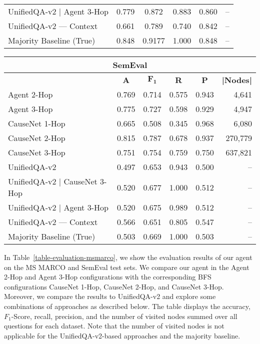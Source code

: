 \begin{table}
\begin{tabular}{lccccr}
			UnifiedQA-v2 | Agent 3-Hop & 0.779 & 0.872 & 0.883 & 0.860 & -- \\
			UnifiedQA-v2 --- Context & 0.661 & 0.789 & 0.740 & 0.842 & --\\
			\midrule
			Majority Baseline (True) & 0.848  & 0.9177 & 1.000 & 0.848 & --\\
			\bottomrule
\end{tabular}
\label{table-evaluation-semeval}
\centering
\renewcommand{\tabcolsep}{6.47pt}
\hspace{-0.20cm}
\begin{tabular}{lccccr} 
			\toprule
			\multicolumn{6}{c}{\textbf{SemEval}}\\
			\midrule
			& \textbf{A} & \textbf{$\mathbf{F_1}$} & \textbf{R} & \textbf{P} & \textbf{|Nodes|}\\
			\midrule
			Agent 2-Hop &  0.769 & 0.714 & 0.575 & 0.943 & 4,641\\
			Agent 3-Hop & 0.775 & 0.727 & 0.598 & 0.929 & 4,947\\
			\midrule
			CauseNet 1-Hop & 0.665 & 0.508 & 0.345 & 0.968 & 6,080 \\ 
			CauseNet 2-Hop & 0.815 & 0.787 & 0.678 & 0.937 & 270,779 \\ 
			CauseNet 3-Hop & 0.751 & 0.754 & 0.759 & 0.750 & 637,821\\ 
			\midrule
			UnifiedQA-v2 & 0.497 & 0.653 & 0.943 & 0.500 & --\\
			UnifiedQA-v2 | CauseNet 3-Hop & 0.520 & 0.677 & 1.000 & 0.512 & -- \\
			UnifiedQA-v2 | Agent 3-Hop & 0.520 & 0.675 & 0.989 & 0.512 & -- \\
			UnifiedQA-v2 --- Context & 0.566 & 0.651 & 0.805 & 0.547 & -- \\
			\midrule
			Majority Baseline (True) & 0.503 & 0.669 & 1.000 & 0.503 & -- \\
			\bottomrule
\end{tabular}
\end{table}
In Table~\ref{table-evaluation-msmarco}, we show the evaluation results of our agent on the MS MARCO and SemEval 
test sets. We compare our agent in the Agent 2-Hop and Agent 3-Hop configurations with the corresponding 
BFS configurations CauseNet 1-Hop, CauseNet 2-Hop, and CauseNet 3-Hop. Moreover, we compare the results 
to UnifiedQA-v2 and explore some combinations of approaches as described below.
The table displays the accuracy, $F_1$-Score, recall, precision,
and the number of visited nodes summed over all questions for each dataset. Note that the number of visited nodes is not applicable for the UnifiedQA-v2-based approaches and the majority baseline.

